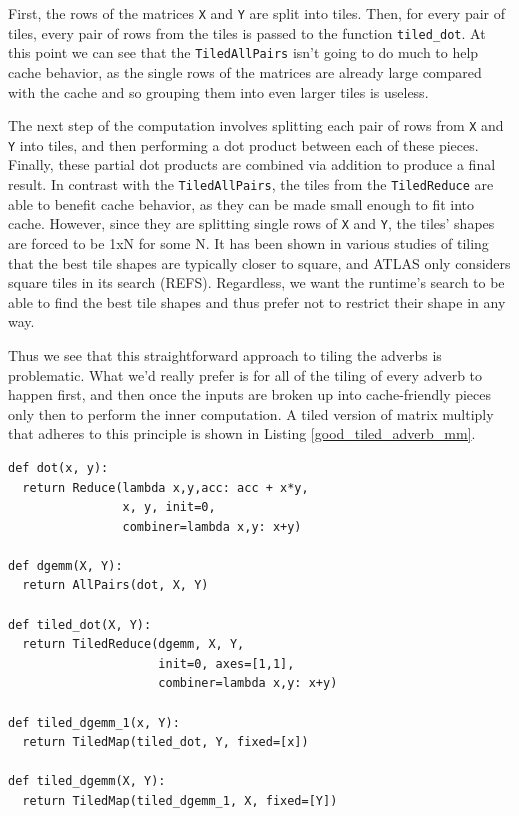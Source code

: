 \documentclass[preprint,9pt]{sigplanconf}
\begin{document}
First, the rows of the matrices \lstinline{X} and \lstinline{Y} are split into tiles.  Then, for every pair of tiles, every pair of rows from the tiles is passed to the function \lstinline{tiled_dot}.  At this point we can see that the \lstinline{TiledAllPairs} isn't going to do much to help cache behavior, as the single rows of the matrices are already large compared with the cache and so grouping them into even larger tiles is useless.

The next step of the computation involves splitting each pair of rows from \lstinline{X} and \lstinline{Y} into tiles, and then performing a dot product between each of these pieces.  Finally, these partial dot products are combined via addition to produce a final result.  In contrast with the \lstinline{TiledAllPairs}, the tiles from the \lstinline{TiledReduce} are able to benefit cache behavior, as they can be made small enough to fit into cache.  However, since they are splitting single rows of \lstinline{X} and \lstinline{Y}, the tiles' shapes are forced to be 1xN for some N.  It has been shown in various studies of tiling that the best tile shapes are typically closer to square, and ATLAS only considers square tiles in its search (REFS).  Regardless, we want the runtime's search to be able to find the best tile shapes and thus prefer not to restrict their shape in any way.

Thus we see that this straightforward approach to tiling the adverbs is problematic.  What we'd really prefer is for all of the tiling of every adverb to happen first, and then once the inputs are broken up into cache-friendly pieces only then to perform the inner computation.  A tiled version of matrix multiply that adheres to this principle is shown in Listing \ref{good_tiled_adverb_mm}.

\begin{lstlisting}[label=good_tiled_adverb_mm, caption={Good Tiled Matrix Multiply}, belowskip=0.5em]
def dot(x, y):
  return Reduce(lambda x,y,acc: acc + x*y,
                x, y, init=0,
                combiner=lambda x,y: x+y)

def dgemm(X, Y):
  return AllPairs(dot, X, Y)

def tiled_dot(X, Y):
  return TiledReduce(dgemm, X, Y,
                     init=0, axes=[1,1],
                     combiner=lambda x,y: x+y)

def tiled_dgemm_1(x, Y):
  return TiledMap(tiled_dot, Y, fixed=[x])
                     
def tiled_dgemm(X, Y):
  return TiledMap(tiled_dgemm_1, X, fixed=[Y])
\end{lstlisting}
\end{document}
